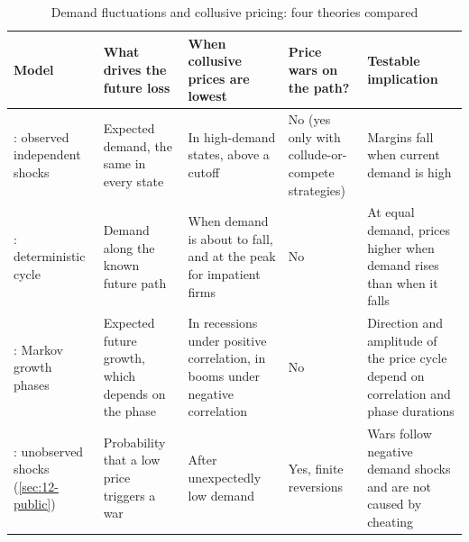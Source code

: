 \begin{table}[htbp]
\centering
\caption{Demand fluctuations and collusive pricing: four theories compared}\label{tab:12-cycle-theories}
\footnotesize
\begin{tabularx}{\textwidth}{@{}>{\raggedright\arraybackslash}p{2.35cm}>{\raggedright\arraybackslash}X>{\raggedright\arraybackslash}X>{\raggedright\arraybackslash}p{2.2cm}>{\raggedright\arraybackslash}X@{}}
\toprule
Model & What drives the future loss & When collusive prices are lowest & Price wars on the path? & Testable implication\\
\midrule
\citet{RotembergSaloner1986}: observed independent shocks & Expected demand, the same in every state & In high-demand states, above a cutoff & No (yes only with collude-or-compete strategies) & Margins fall when current demand is high\\[3pt]
\citet{HaltiwangerHarrington1991}: deterministic cycle & Demand along the known future path & When demand is about to fall, and at the peak for impatient firms & No & At equal demand, prices higher when demand rises than when it falls\\[3pt]
\citet{BagwellStaiger1997}: Markov growth phases & Expected future growth, which depends on the phase & In recessions under positive correlation, in booms under negative correlation & No & Direction and amplitude of the price cycle depend on correlation and phase durations\\[3pt]
\citet{GreenPorter1984}: unobserved shocks (\cref{sec:12-public}) & Probability that a low price triggers a war & After unexpectedly low demand & Yes, finite reversions & Wars follow negative demand shocks and are not caused by cheating\\
\bottomrule
\end{tabularx}
\end{table}
